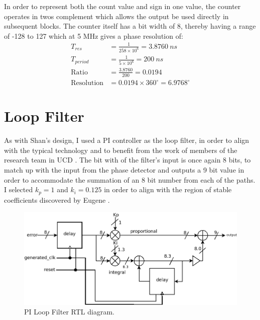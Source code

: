 \documentclass[11pt,english,british]{report}
\begin{document}
In order to represent both the count value and sign in one value, the counter operates in twos complement which allows the output be used directly in subsequent blocks. The counter itself has a bit width of 8, thereby having a range of -128 to 127 which at 5 MHz gives a phase resolution of:
\begin{align*}
	T_{res} &= \frac{1}{258\times 10^6} = 3.8760~ns \\
	T_{period} &= \frac{1}{5\times 10^6} = 200~ns \\
	\textrm{Ratio} &=\frac{3.8760}{200} = 0.0194 \\
	\textrm{Resolution} & = 0.0194\times 360^\circ = 6.9768^\circ
\end{align*}

\section{Loop Filter}
As with Shan's design, I used a PI controller as the loop filter, in order to align with the typical technology and to benefit from the work of members of the research team in UCD \cite{shan2014phd,koskin2018generation}.
The bit with of the filter's input is once again 8 bits, to match up with the input from the phase detector and outputs a 9 bit value in order to accommodate the summation of an 8 bit number from each of the paths. I selected $k_p = 1$ and $k_i = 0.125$ in order to align with the region of stable coefficients discovered by Eugene \cite{koskin2018generation}.
\begin{figure}[h]
	\centering
	\includegraphics[scale=0.35]{../loop_filter}
	\caption{PI Loop Filter RTL diagram.}
	\label{fig:my_pi}
\end{figure}
\end{document}
